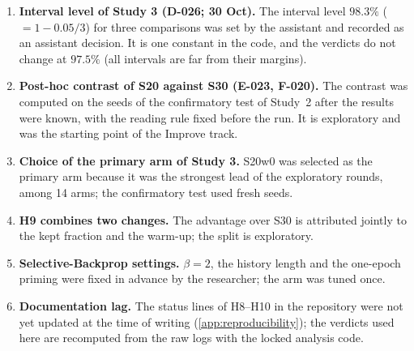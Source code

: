 \begin{enumerate}
\item \textbf{Interval level of Study 3 (D-026; 30 Oct).} The interval level $98.3\%$ ($=1-0.05/3$) for three comparisons was set by the assistant and recorded as an assistant decision. It is one constant in the code, and the verdicts do not change at $97.5\%$ (all intervals are far from their margins).
\item \textbf{Post-hoc contrast of S20 against S30 (E-023, F-020).} The contrast was computed on the seeds of the confirmatory test of Study~2 after the results were known, with the reading rule fixed before the run. It is exploratory and was the starting point of the Improve track.
\item \textbf{Choice of the primary arm of Study 3.} S20w0 was selected as the primary arm because it was the strongest lead of the exploratory rounds, among 14 arms; the confirmatory test used fresh seeds.
\item \textbf{H9 combines two changes.} The advantage over S30 is attributed jointly to the kept fraction and the warm-up; the split is exploratory.
\item \textbf{Selective-Backprop settings.} $\beta=2$, the history length and the one-epoch priming were fixed in advance by the researcher; the arm was tuned once.
\item \textbf{Documentation lag.} The status lines of H8--H10 in the repository were not yet updated at the time of writing (\cref{app:reproducibility}); the verdicts used here are recomputed from the raw logs with the locked analysis code.
\end{enumerate}
